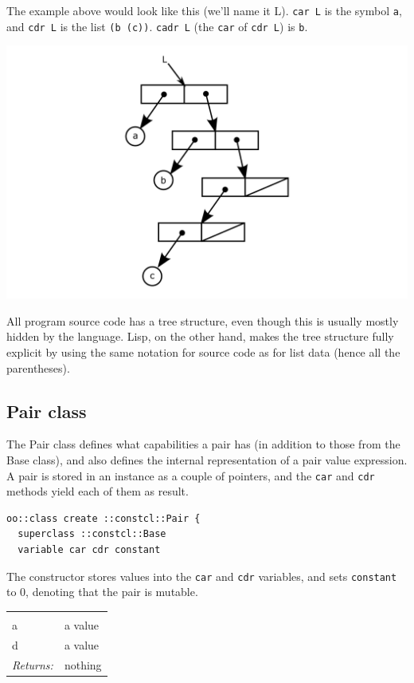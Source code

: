 \documentclass[twoside]{report}
\begin{document}
The example above would look like this (we'll name it L). \texttt{car L} is the symbol \texttt{a}, and \texttt{cdr L} is the list \texttt{(b (c))}. \texttt{cadr L} (the \texttt{car} of \texttt{cdr L}) is \texttt{b}.

\includegraphics{images/tree.png}

All program source code has a tree structure, even though this is usually mostly hidden by the language. Lisp, on the other hand, makes the tree structure fully explicit by using the same notation for source code as for list data (hence all the parentheses).

\subsection{Pair class}
\label{pair-class}

The Pair class defines what capabilities a pair has (in addition to those from the Base class), and also defines the internal representation of a pair value expression. A pair is stored in an instance as a couple of pointers, and the \texttt{car} and \texttt{cdr} methods yield each of them as result.

\begin{lstlisting}
oo::class create ::constcl::Pair {
  superclass ::constcl::Base
  variable car cdr constant
\end{lstlisting}

The constructor stores values into the \texttt{car} and \texttt{cdr} variables, and sets \texttt{constant} to 0, denoting that the pair is mutable.

\noindent\begin{tabular}{ |p{1.9cm} p{8cm}| }
\hline
\rowcolor[HTML]{CCCCCC} \multicolumn{2}{|l|}{\bf Pair constructor (internal)} \\
a & a value \\
d & a value \\
\textit{Returns:} & nothing \\
\hline
\end{tabular}
\end{document}
